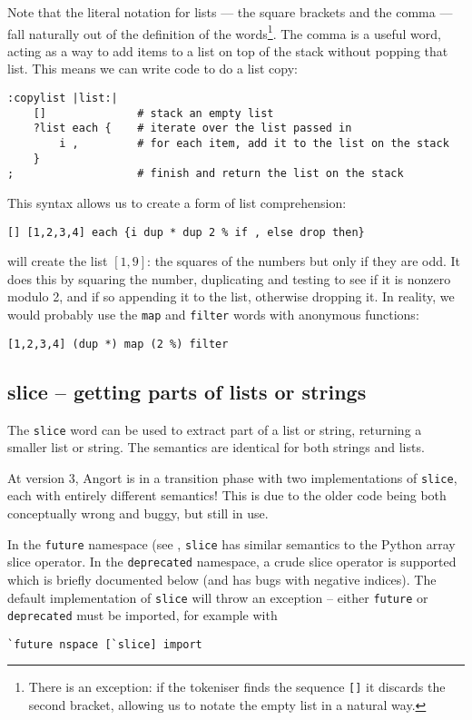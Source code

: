 Note that the literal notation for lists --- the square brackets and the
comma --- fall naturally out of the definition of the words\footnote{There
is an exception: if the tokeniser finds the sequence \texttt{[]} it discards
the second bracket, allowing us to notate the empty list in a natural way.}.
The comma
is a useful word, acting as a way to add items to a list on top of the stack
without popping that list. This means we can write code to do a list copy:
\begin{lstlisting}
:copylist |list:|
    []              # stack an empty list
    ?list each {    # iterate over the list passed in
        i ,         # for each item, add it to the list on the stack
    }
;                   # finish and return the list on the stack          
\end{lstlisting}
This syntax allows us to create a form of list comprehension:
\begin{lstlisting}
[] [1,2,3,4] each {i dup * dup 2 % if , else drop then}
\end{lstlisting}
will create the list $[1,9]$: the squares of the numbers but only 
if they are odd. It does this by squaring the number, duplicating and
testing to see if it is nonzero modulo 2, and if so appending it to the list,
otherwise dropping it. 
In reality, we would probably use the \texttt{map} and
\texttt{filter} words with anonymous functions:
\begin{lstlisting}
[1,2,3,4] (dup *) map (2 %) filter
\end{lstlisting}


\subsection{slice -- getting parts of lists or strings}
The \texttt{slice} word can be used to extract part of a list or string,
returning a smaller list or string. The semantics are identical for both
strings and lists.

At version 3, Angort is in a transition
phase with two implementations of \texttt{slice}, each with entirely different
semantics! This is due to the older code being both conceptually wrong
and buggy, but still in use. 

In the \texttt{future} namespace (see , \texttt{slice} has similar semantics
to the Python array slice operator. In the \texttt{deprecated} namespace,
a crude slice operator is supported which is briefly documented below
(and has bugs with negative indices). The default implementation of \texttt{slice} will
throw an exception -- either \texttt{future} or \texttt{deprecated} must
be imported, for example with
\begin{lstlisting}
`future nspace [`slice] import
\end{lstlisting}


